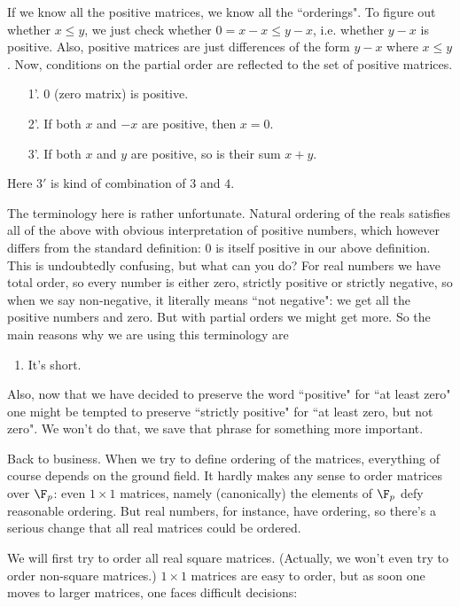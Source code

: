 If we know all the positive matrices, we know all the ``orderings". To figure out whether $x \leq y$, we just check whether $0 = x - x \leq y - x$, i.e. whether $y - x$ is positive. Also, positive matrices are just differences of the form $y - x$ where $x \leq y$. Now, conditions on the partial order are reflected to the set of positive matrices.
\begin{enumerate}
	\item[1'.] $0$ (zero matrix) is positive.
	\item[2'.] If both $x$ and $-x$ are positive, then $x = 0$.
	\item[3'.] If both $x$ and $y$ are positive, so is their sum $x + y$.
\end{enumerate}
Here $3'$ is kind of combination of $3$ and $4$.

The terminology here is rather unfortunate. Natural ordering of the reals satisfies all of the above with obvious interpretation of positive numbers, which however differs from the standard definition: $0$ is itself positive in our above definition. This is undoubtedly confusing, but what can you do? For real numbers we have total order, so every number is either zero, strictly positive or strictly negative, so when we say non-negative, it literally means ``not negative": we get all the positive numbers and zero. But with partial orders we might get more. So the main reasons why we are using this terminology are
\begin{enumerate}
	\item It's short.
\end{enumerate}
Also, now that we have decided to preserve the word ``positive" for ``at least zero" one might be tempted to preserve ``strictly positive" for ``at least zero, but not zero". We won't do that, we save that phrase for something more important.

Back to business. When we try to define ordering of the matrices, everything of course depends on the ground field. It hardly makes any sense to order matrices over $\F_{p}$: even $1 \times 1$ matrices, namely (canonically) the elements of $\F_{p}$ defy reasonable ordering. But real numbers, for instance, have ordering, so there's a serious change that all real matrices could be ordered.

We will first try to order all real square matrices. (Actually, we won't even try to order non-square matrices.) $1 \times 1$ matrices are easy to order, but as soon one moves to larger matrices, one faces difficult decisions:

